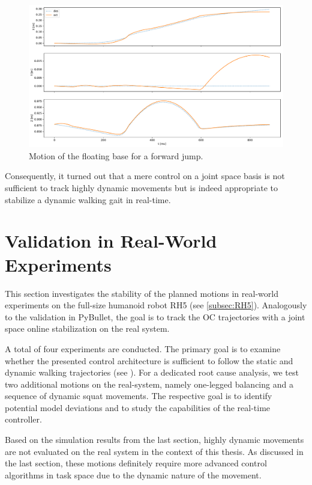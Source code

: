 \begin{figure}[h!]
\centering	
\includegraphics[width=1\textwidth]{fig/jumpForward/pybullet/pybulletBase}
\caption[Motion of the floating base for a forward jump]{Motion of the floating base for a forward jump.}
\label{fig:jumpForward_pybulletBase}
\end{figure}

Consequently, it turned out that a mere control on a joint space basis is not sufficient to track highly dynamic movements but is indeed appropriate to stabilize a dynamic walking gait in real-time. 


\section{Validation in Real-World Experiments}\label{sec:OnlineExperiments}
This section investigates the stability of the planned motions in real-world experiments on the full-size humanoid robot RH5 (see \cref{subsec:RH5}). Analogously to the validation in PyBullet, the goal is to track the \gls{OC} trajectories with a joint space online stabilization on the real system. 

A total of four experiments are conducted. The primary goal is to examine whether the presented control architecture is sufficient to follow the static and dynamic walking trajectories (see ). For a dedicated root cause analysis, we test two additional motions on the real-system, namely one-legged balancing and a sequence of dynamic squat movements. The respective goal is to identify potential model deviations and to study the capabilities of the real-time controller.

Based on the simulation results from the last section, highly dynamic movements are not evaluated on the real system in the context of this thesis. As discussed in the last section, these motions definitely require more advanced control algorithms in task space due to the dynamic nature of the movement. 

